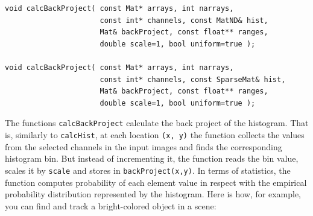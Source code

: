 \begin{lstlisting}
void calcBackProject( const Mat* arrays, int narrays,
                      const int* channels, const MatND& hist,
                      Mat& backProject, const float** ranges,
                      double scale=1, bool uniform=true );
    
void calcBackProject( const Mat* arrays, int narrays,
                      const int* channels, const SparseMat& hist,
                      Mat& backProject, const float** ranges,
                      double scale=1, bool uniform=true );
\end{lstlisting}
\begin{description}
\end{description}

The functions \texttt{calcBackProject} calculate the back project of the histogram. That is, similarly to \texttt{calcHist}, at each location \texttt{(x, y)} the function collects the values from the selected channels in the input images and finds the corresponding histogram bin. But instead of incrementing it, the function reads the bin value, scales it by \texttt{scale} and stores in \texttt{backProject(x,y)}. In terms of statistics, the function computes probability of each element value in respect with the empirical probability distribution represented by the histogram. Here is how, for example, you can find and track a bright-colored object in a scene:

